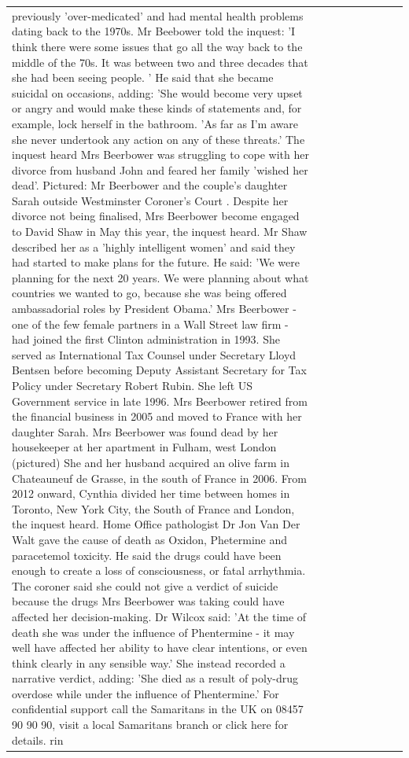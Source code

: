 \begin{table}[H]
\begin{tabular}{lllrlllll}
previously 'over-medicated' and had mental health problems dating back to the 1970s. Mr Beebower told the inquest: 'I think there were some issues that go all the way back to the middle of the 70s. It was between two and three decades that she had been seeing people. ' He said that she became suicidal on occasions, adding: 'She would become very upset or angry and would make these kinds of statements and, for example, lock herself in the bathroom. 'As far as I'm aware she never undertook any action on any of these threats.' The inquest heard Mrs Beerbower was struggling to cope with her divorce from husband John and feared her family 'wished her dead'. Pictured: Mr Beerbower and the couple's daughter Sarah outside Westminster Coroner's Court . Despite her divorce not being finalised, Mrs Beerbower become engaged to David Shaw in May this year, the inquest heard. Mr Shaw described her as a 'highly intelligent women' and said they had started to make plans for the future. He said: 'We were planning for the next 20 years. We were planning about what countries we wanted to go, because she was being offered ambassadorial roles by President Obama.' Mrs Beerbower - one of the few female partners in a Wall Street law firm - had joined the first Clinton administration in 1993. She served as International Tax Counsel under Secretary Lloyd Bentsen before becoming Deputy Assistant Secretary for Tax Policy under Secretary Robert Rubin. She left US Government service in late 1996. Mrs Beerbower retired from the financial business in 2005 and moved to France with her daughter Sarah. Mrs Beerbower was found dead by her housekeeper at her apartment in Fulham, west London (pictured) She and her husband acquired an olive farm in Chateauneuf de Grasse, in the south of France in 2006. From 2012 onward, Cynthia divided her time between homes in Toronto, New York City, the South of France and London, the inquest heard. Home Office pathologist Dr Jon Van Der Walt gave the cause of death as Oxidon, Phetermine and paracetemol toxicity. He said the drugs could have been enough to create a loss of consciousness, or fatal arrhythmia. The coroner said she could not give a verdict of suicide because the drugs Mrs Beerbower was taking could have affected her decision-making. Dr Wilcox said: 'At the time of death she was under the influence of Phentermine - it may well have affected her ability to have clear intentions, or even think clearly in any sensible way.' She instead recorded a narrative verdict, adding: 'She died as a result of poly-drug overdose while under the influence of Phentermine.' For confidential support call the Samaritans in the UK on 08457 90 90 90, visit a local Samaritans branch or click here for details. rin \\

\end{tabular}
\end{table}
